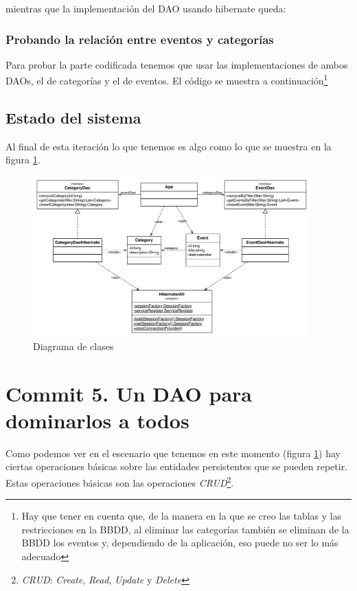 \documentclass{article}
\begin{document}
	mientras que la implementación del DAO usando hibernate queda:


\subsubsection{Probando la relación entre eventos y categorías}\label{sec:c04:EventCategory}
	Para probar la parte codificada tenemos que usar las implementaciones de ambos DAOs, el de categorías y el de eventos. El código se muestra a continuación\footnote{Hay que tener en cuenta que, de la manera en la que se creo las tablas y las restricciones en la BBDD, al eliminar las categorías también se eliminan de la BBDD los eventos y, dependiendo de la aplicación, eso puede no ser lo más adecuado}


\subsection{Estado del sistema}
	Al final de esta iteración lo que tenemos es algo como lo que se muestra en la figura \ref{fig:c04:UmlClass}.
\begin{figure}[h]
  \centering
    \includegraphics[width=0.95\textwidth]{commit04/img/UmlClass.pdf}
  \caption{Diagrama de clases}
  \label{fig:c04:UmlClass}
\end{figure}	

\section{Commit 5. Un DAO para dominarlos a todos}

	Como podemos ver en el escenario que tenemos en este momento (figura \ref{fig:c04:UmlClass}) hay ciertas operaciones básicas sobre las entidades persistentes que se pueden repetir. Estas operaciones básicas son las operaciones \emph{CRUD}\footnote{\emph{CRUD}: \emph{Create}, \emph{Read}, \emph{Update} y \emph{Delete}}.
\end{document}
